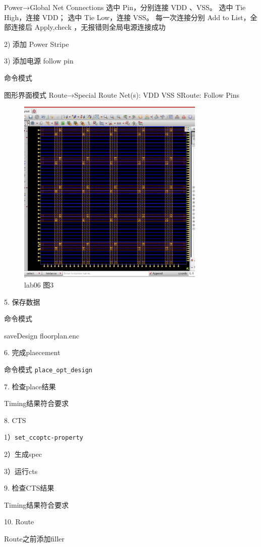 Power→Global Net Connections
选中 Pin，分别连接 VDD 、VSS。
选中 Tie High，连接 VDD；
选中 Tie Low，连接 VSS。
每一次连接分别 Add to List，全部连接后 Apply,check ，无报错则全局电源连接成功
 
2) 添加 Power Stripe
    
3) 添加电源 follow pin

命令模式

图形界面模式
Route→Special Route
Net(s): VDD VSS
SRoute: Follow Pins

\begin{figure}[H]
    \centering
    \includegraphics[width=0.8\textwidth]{images/lab06-03.png}
    \caption{lab06 图3}
\end{figure}

5. 保存数据

命令模式

saveDesign floorplan.enc

6. 完成plaecement

命令模式 \texttt{place\_opt\_design}

7. 检查place结果

Timing结果符合要求

8. CTS

1）\texttt{set\_ccoptc-property}

2）生成spec
  
3）运行cts
 
9. 检查CTS结果

Timing结果符合要求

10. Route

Route之前添加filler

